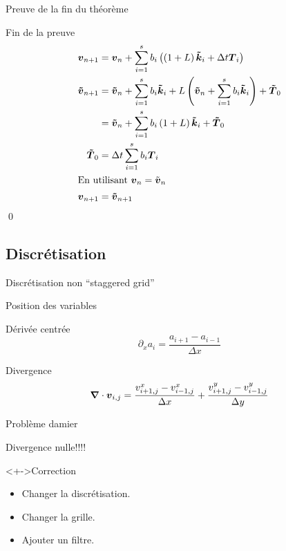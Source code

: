\begin{frame}{Preuve de la fin du théorème}

\begin{block}{Fin de la preuve}
 \begin{align*}
{\boldsymbol {v}}_{n+1}&={\boldsymbol {v}}_{n}+\sum_{i=1}^{s}b_{i}\left(\left(1+L\right){\boldsymbol {\tilde{k}}}_i+\Delta t {\boldsymbol {T}}_{i}\right)\\
{\boldsymbol {\tilde{v}}}_{n+1}&={\boldsymbol {\tilde{v}}}_{n}+\sum_{i=1}^{s}b_{i}{\boldsymbol {\tilde{k}}}_{i}+L\left({\boldsymbol {\tilde{v}}}_{n}+\sum_{i=1}^{s}b_{i}{\boldsymbol {\tilde{k}}}_{i}\right)+{\boldsymbol {\tilde{T}}}_0\\
&={\boldsymbol {\tilde{v}}}_{n}+\sum_{i=1}^{s}b_{i}\left(1+L\right){\boldsymbol {\tilde{k}}}_{i}+{\boldsymbol {\tilde{T}}}_0\\
{\boldsymbol {\tilde{T}}}_0&=\Delta t\sum_{i=1}^{s}b_{i}{\boldsymbol {T}}_{i}\\
\intertext{En utilisant ${\boldsymbol {v}}_{n}=\tilde{{\boldsymbol {v}}}_{n}$}
{\boldsymbol {v}}_{n+1}&={\boldsymbol {\tilde{v}}}_{n+1}
\end{align*}
\qed
\end{block}

\end{frame}
\subsection{Discrétisation}
\begin{frame}{Discrétisation non  ``staggered grid''}
\begin{block}{Position des variables}
\shorthandoff{;:} 
\shorthandon{:;}
\end{block}
\begin{block}{Dérivée centrée}
 \begin{equation*}
  \partial_x a_i=\frac{a_{i+1}-a_{i-1}}{\Delta x}
\end{equation*}
\end{block}

\begin{block}{Divergence}
\begin{equation*}
  {\boldsymbol {\nabla}} \cdot {\boldsymbol {v}}_{i,j}=\frac{v^{x}_{i+1,j}-v^{x}_{i-1,j}}{\Delta x}+\frac{v^{y}_{i+1,j}-v^{y}_{i-1,j}}{\Delta y}
\end{equation*}
\end{block}
\end{frame}

\begin{frame}{Problème damier}
\begin{block}{\alert{Divergence nulle!!!!}}
\end{block}

\begin{block}<+->{Correction}
 \begin{itemize}[<+->]
  \item Changer la discrétisation.
  \item Changer la grille.
  \item Ajouter un filtre.
 \end{itemize}

\end{block}

 
\end{frame}

